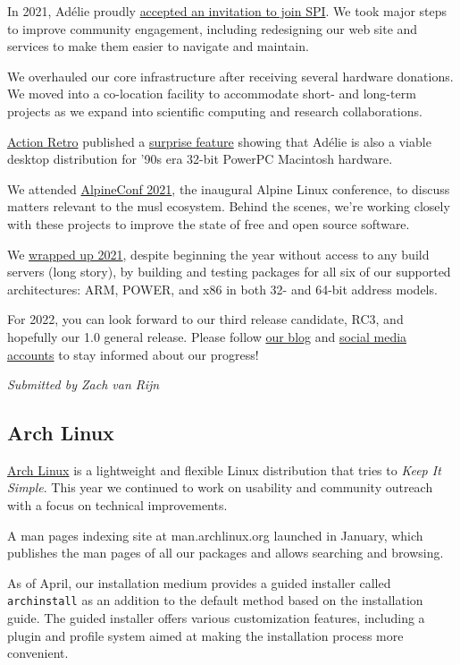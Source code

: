 \documentclass[a4paper]{report}
\begin{document}
In 2021, Adélie proudly \href{https://www.spi-inc.org/projects/adelielinux/}{accepted an invitation to join SPI}. We took major steps to improve community engagement, including redesigning our web site and services to make them easier to navigate and maintain.

We overhauled our core infrastructure after receiving several hardware donations. We moved into a co-location facility to accommodate short- and long-term projects as we expand into scientific computing and research collaborations.

\href{https://actionretro.com/}{Action Retro} published a \href{https://www.youtube.com/watch?v=AArGaJGFVH4}{surprise feature} showing that Adélie is also a viable desktop distribution for '90s era 32-bit PowerPC Macintosh hardware.

We attended \href{https://alpinelinux.org/conf/}{{AlpineConf 2021}}, the inaugural Alpine Linux conference, to discuss matters relevant to the musl ecosystem. Behind the scenes, we're working closely with these projects to improve the state of free and open source software.

We \href{https://blog.adelielinux.org/2021/12/31/new-year-new-builders/}{wrapped up 2021}, despite beginning the year without access to any build servers (long story), by building and testing packages for all six of our supported architectures: ARM, POWER, and x86 in both 32- and 64-bit address models.

For 2022, you can look forward to our third release candidate, RC3, and hopefully our 1.0 general release. Please follow \href{https://blog.adelielinux.org/}{our blog} and \href{https://www.adelielinux.org/contact/}{social media accounts} to stay informed about our progress!

{\em Submitted by Zach van Rijn}

\subsection{Arch Linux}

\href{https://archlinux.org/}{Arch Linux} is a lightweight and flexible Linux distribution that tries to \textit{Keep It Simple}.  This year we continued to work on usability and community outreach with a focus on technical improvements.

A man pages indexing site at man.archlinux.org launched in January, which publishes the man pages of all our packages and allows searching and browsing.

As of April, our installation medium provides a guided installer called \texttt{archinstall} as an addition to the default method based on the installation guide. The guided installer offers various customization features, including a plugin and profile system aimed at making the installation process more convenient.
\end{document}
